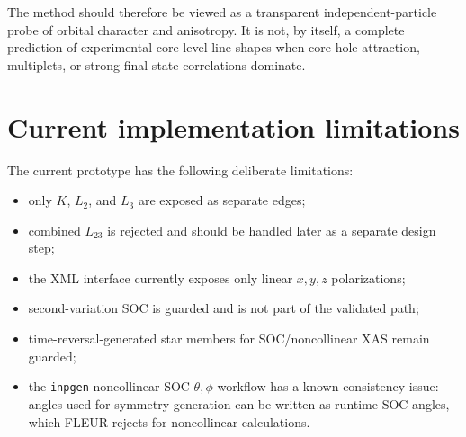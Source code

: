 \documentclass[11pt,a4paper]{article}
\begin{document}
The method should therefore be viewed as a transparent independent-particle
probe of orbital character and anisotropy. It is not, by itself, a complete
prediction of experimental core-level line shapes when core-hole attraction,
multiplets, or strong final-state correlations dominate.

\section{Current implementation limitations}

The current prototype has the following deliberate limitations:
\begin{itemize}
  \item only \(K\), \(L_2\), and \(L_3\) are exposed as separate edges;
  \item combined \(L_{23}\) is rejected and should be handled later as a
  separate design step;
  \item the XML interface currently exposes only linear \(x,y,z\) polarizations;
  \item second-variation SOC is guarded and is not part of the validated path;
  \item time-reversal-generated star members for SOC/noncollinear XAS remain
  guarded;
  \item the \texttt{inpgen} noncollinear-SOC \(\theta,\phi\) workflow has a
  known consistency issue: angles used for symmetry generation can be written
  as runtime SOC angles, which FLEUR rejects for noncollinear calculations.
\end{itemize}
\end{document}
